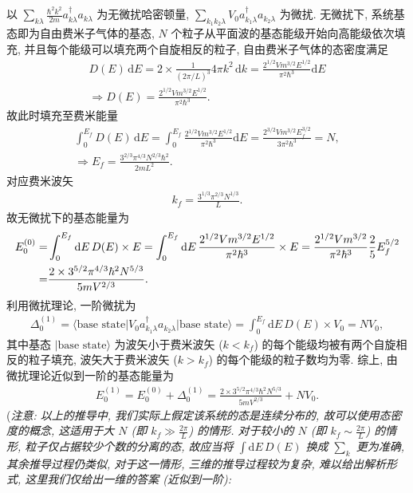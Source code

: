 \documentclass{assignment}
\begin{document}
\begin{sol}
    以 $\sum_{k\lambda}\frac{\hbar^2k^2}{2m}a_{k\lambda}^{\dagger}a_{k\lambda}$ 为无微扰哈密顿量, $\sum_{k_1k_2\lambda}V_0a_{k_1\lambda}^{\dagger}a_{k_2\lambda}$ 为微扰. 无微扰下, 系统基态即为自由费米子气体的基态, $N$ 个粒子从平面波的基态能级开始向高能级依次填充, 并且每个能级可以填充两个自旋相反的粒子, 自由费米子气体的态密度满足
    \begin{gather}
        D(E)\,\mathrm{d}E=2\times\frac{1}{(2\pi /L)^3}4\pi k^2\,\mathrm{d}k=\frac{2^{1/2}Vm^{3/2}E^{1/2}}{\pi^2\hbar^3}\mathrm{d}E\\
        \Longrightarrow D(E)=\frac{2^{1/2}Vm^{3/2}E^{1/2}}{\pi^2\hbar^3}.
    \end{gather}
    故此时填充至费米能量
    \begin{gather}
        \int_0^{E_f}D(E)\,\mathrm{d}E=\int_0^{E_f}\frac{2^{1/2}Vm^{3/2}E^{1/2}}{\pi^2\hbar^3}\mathrm{d}E=\frac{2^{3/2}Vm^{3/2}E_f^{3/2}}{3\pi^2\hbar^3}=N,\\
        \Longrightarrow E_f=\frac{3^{2/3}\pi^{4/3}N^{2/3}\hbar^2}{2mL^2}.
    \end{gather}
    对应费米波矢
    \begin{align}
        k_f=\frac{3^{1/3}\pi^{2/3}N^{1/3}}{L}.
    \end{align}
    故无微扰下的基态能量为
    \begin{align}
        \notag E_0^{(0)}=&\int_0^{E_f}\mathrm{d}E\,D(E)\times E=\int_0^{E_f}\mathrm{d}E\,\frac{2^{1/2}Vm^{3/2}E^{1/2}}{\pi^2\hbar^3}\times E=\frac{2^{1/2}Vm^{3/2}}{\pi^2\hbar^3}\frac{2}{5}E_f^{5/2}\\
        =&\frac{2\times 3^{5/2}\pi^{4/3}\hbar^2N^{5/3}}{5mV^{2/3}}.
    \end{align}
    利用微扰理论, 一阶微扰为
    \begin{align}
        \Delta_0^{(1)}=\langle\text{base state}\rvert V_0a_{k_1\lambda}^{\dagger}a_{k_2\lambda}\lvert\text{base state}\rangle=\int_0^{E_f}\mathrm{d}E\,D(E)\times V_0=NV_0,
    \end{align}
    其中基态 $\lvert\text{base state}\rangle$ 为波矢小于费米波矢 ($k<k_f$) 的每个能级均被有两个自旋相反的粒子填充, 波矢大于费米波矢 ($k>k_f$) 的每个能级的粒子数均为零. 综上, 由微扰理论近似到一阶的基态能量为
    \begin{align}
        E_0^{(1)}=E_0^{(0)}+\Delta_0^{(1)}=\frac{2\times 3^{5/2}\pi^{4/3}\hbar^2N^{5/3}}{5mV^{2/3}}+NV_0.
    \end{align}
    (\textit{注意: 以上的推导中, 我们实际上假定该系统的态是连续分布的, 故可以使用态密度的概念, 这适用于大 $N$ (即 $k_f\gg\frac{2\pi}{L}$) 的情形. 对于较小的 $N$ (即 $k_f\sim\frac{2\pi}{L}$) 的情形, 粒子仅占据较少个数的分离的态, 故应当将 $\int\mathrm{d}E\,D(E)$ 换成 $\sum_{k}$ 更为准确, 其余推导过程仍类似, 对于这一情形, 三维的推导过程较为复杂, 难以给出解析形式, 这里我们仅给出一维的答案 (近似到一阶):
}
\end{sol}
\end{document}
